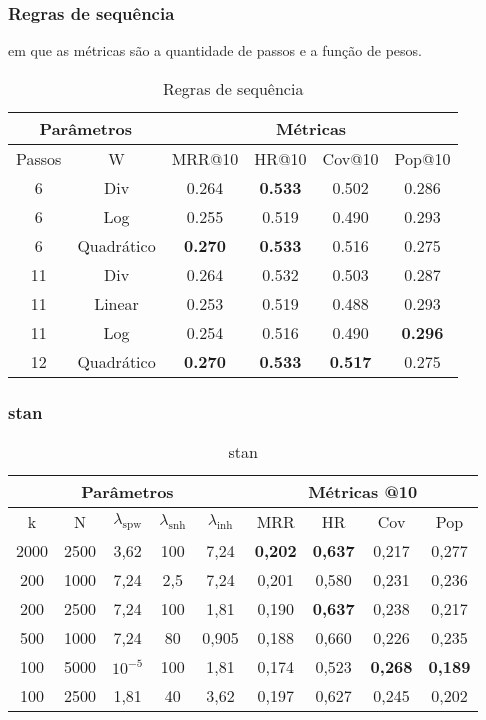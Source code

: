 \subsubsection{Regras de sequência}
em que as métricas são a quantidade de passos e a função de pesos.
\begin{table}[htbp]
    \centering
    \begin{tabular}{|c|c|c|c|c|c|}
        \hline
        \multicolumn{2}{|c|}{Parâmetros} & \multicolumn{4}{c|}{Métricas} \\
        \hline
        Passos & W & MRR@10 & HR@10 & Cov@10 & Pop@10 \\
        \hline
        6 & Div & 0.264 & \textbf{0.533} & 0.502 & 0.286 \\
        \hline
        6 & Log & 0.255 & 0.519 & 0.490 & 0.293 \\
        \hline
        6 & Quadrático & \textbf{0.270} & \textbf{0.533} & 0.516 & 0.275 \\
        \hline
        11 & Div & 0.264 & 0.532 & 0.503 & 0.287 \\
        \hline
        11 & Linear & 0.253 & 0.519 & 0.488 & 0.293 \\
        \hline
        11 & Log & 0.254 & 0.516 & 0.490 & \textbf{0.296} \\
        \hline
        12 & Quadrático & \textbf{0.270} & \textbf{0.533} & \textbf{0.517} & 0.275 \\
        \hline
        \end{tabular}
    \caption{Regras de sequência}
\end{table}


\subsubsection{stan}
\begin{table}[htbp]
    \centering
    \begin{tabular}{|c|c|c|c|c|c|c|c|c|}
      \hline
      \multicolumn{5}{|c|}{Parâmetros} & \multicolumn{4}{c|}{Métricas @10} \\
      \hline
      k & N & $\lambda_{\text{spw}}$ & $\lambda_{\text{snh}}$ & $\lambda_{\text{inh}}$ & MRR & HR & Cov & Pop \\
      \hline
      2000 & 2500 & 3,62 & 100 & 7,24 & \textbf{0,202} & \textbf{0,637} & 0,217 & 0,277 \\
      \hline
      200 & 1000 & 7,24 & 2,5 & 7,24 & 0,201 & 0,580 & 0,231 & 0,236 \\
      \hline
      200 & 2500 & 7,24 & 100 & 1,81& 0,190 & \textbf{0,637} & 0,238 & 0,217 \\
      \hline
      500 & 1000 & 7,24 & 80 & 0,905 & 0,188 & 0,660 & 0,226 & 0,235 \\
      \hline
      100 & 5000 & $10^{-5}$ & 100 & 1,81 & 0,174 & 0,523 & \textbf{0,268} & \textbf{0,189} \\
      \hline
      100 & 2500 & 1,81 & 40 & 3,62 & 0,197 & 0,627 & 0,245 & 0,202 \\
      \hline

    \end{tabular}
    \caption{stan}
  \end{table}



